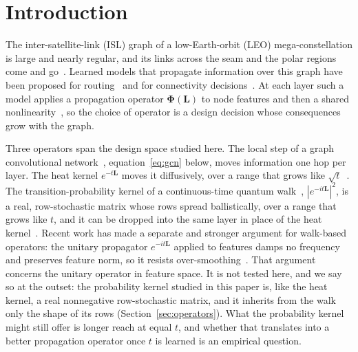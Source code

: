 \documentclass[preprint,11pt,3p]{elsarticle}
\newcommand{\Lap}{\mathbf{L}}
\newcommand{\Phiop}{\boldsymbol{\Phi}}
\begin{document}
\section{Introduction}

The inter-satellite-link (ISL) graph of a low-Earth-orbit (LEO) mega-constellation is large and
nearly regular, and its links across the seam and the polar regions come and
go~\cite{plusgrid,starlink}. Learned models that propagate information over this graph have been
proposed for routing~\cite{lira,deepladu} and for connectivity decisions~\cite{comsat}. At each
layer such a model applies a propagation operator $\Phiop(\Lap)$ to node features and then a
shared nonlinearity~\cite{gcn,shuman}, so the choice of operator is a design decision whose
consequences grow with the graph.

Three operators span the design space studied here. The local step of a graph convolutional
network~\cite{gcn}, equation~\eqref{eq:gcn} below, moves information one hop per layer. The heat
kernel $e^{-t\Lap}$ moves it diffusively, over a range that grows like $\sqrt{t}$~\cite{grand}.
The transition-probability kernel of a continuous-time quantum walk~\cite{farhi},
$|e^{-it\Lap}|^{2}$, is a real, row-stochastic matrix whose rows spread ballistically, over a range
that grows like $t$, and it can be dropped into the same layer in place of the heat
kernel~\cite{qwnn,qgnn}. Recent work has made a separate and stronger argument for walk-based
operators: the unitary propagator $e^{-it\Lap}$ applied to features damps no frequency and
preserves feature norm, so it resists over-smoothing~\cite{ctqwgnn,ctqwformer,graphqwalk}. That
argument concerns the unitary operator in feature space. It is not tested here, and we say so at
the outset: the probability kernel studied in this paper is, like the heat kernel, a real
nonnegative row-stochastic matrix, and it inherits from the walk only the shape of its rows
(Section~\ref{sec:operators}). What the probability kernel might still offer is longer reach at
equal $t$, and whether that translates into a better propagation operator once $t$ is learned is
an empirical question.
\end{document}
